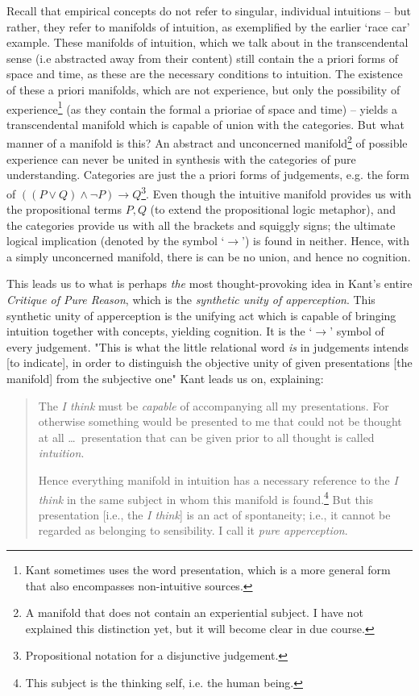 \noindent
Recall that empirical concepts do not refer to singular, individual intuitions -- but rather, they refer to manifolds of intuition, as exemplified by the earlier `race car' example. These manifolds of intuition, which we talk about in the transcendental sense (i.e abstracted away from their content) still contain the a priori forms of space and time, as these are the necessary conditions to intuition. The existence of these a priori manifolds, which are not experience, but only the possibility of experience\footnote{Kant sometimes uses the word presentation, which is a more general form that also encompasses non-intuitive sources.} (as they contain the formal a prioriae of space and time) -- yields a transcendental manifold which is capable of union with the categories. But what manner of a manifold is this? An abstract and unconcerned manifold\footnote{A manifold that does not contain an experiential subject. I have not explained this distinction yet, but it will become clear in due course.} of possible experience can never be united in synthesis with the categories of pure understanding. Categories are just the a priori forms of judgements, e.g. the form of $((P \lor Q) \land \neg P) \to Q$\footnote{Propositional notation for a disjunctive judgement.}. Even though the intuitive manifold provides us with the propositional terms $P, Q$ (to extend the propositional logic metaphor), and the categories provide us with all the brackets and squiggly signs; the ultimate logical implication (denoted by the symbol `$\to$') is found in neither. Hence, with a simply unconcerned manifold, there is can be no union, and hence no cognition.

This leads us to what is perhaps \emph{the} most thought-provoking idea in Kant's entire \emph{Critique of Pure Reason}, which is the \emph{synthetic unity of apperception}. This synthetic unity of apperception is the unifying act which is capable of bringing intuition together with concepts, yielding cognition. It is the `$\to$' symbol of every judgement. "This is what the little relational word \emph{is} in judgements intends [to indicate], in order to distinguish the objective unity of given presentations [the manifold] from the subjective one" \autocite[B142]{hackett} Kant leads us on, explaining:

\begin{quote}
  The \emph{I think} must be \emph{capable} of accompanying all my presentations. For otherwise something would be presented to me that could not be thought at all \ldots\ presentation that can be given prior to all thought is called \emph{intuition}.

  Hence everything manifold in intuition has a necessary reference to the \emph{I think} in the same subject in whom this manifold is found.\footnote{This subject is the thinking self, i.e. the human being.} But this presentation [i.e., the \emph{I think}] is an act of spontaneity; i.e., it cannot be regarded as belonging to sensibility. I call it \emph{pure apperception}.

  \autocite[B132]{hackett}
\end{quote}


